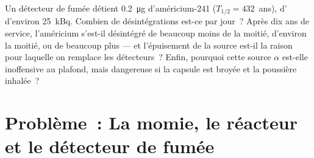 \begin{exercise}[$\star\star\star$]\label{exo:g11:nucleus-radioactivity:15}
Un détecteur de fumée détient \qty{0.2}{\micro\gram} d'américium-241
($T_{1/2} = 432$~ans), d'
 d'environ \qty{25}{kBq}.
Combien de désintégrations est-ce par jour~? Après dix ans de service,
l'américium s'est-il désintégré de beaucoup moins de la moitié,
d'environ la moitié, ou de beaucoup plus --- et l'épuisement de la
source est-il la raison pour laquelle on remplace les détecteurs~?
Enfin, pourquoi cette source $\alpha$ est-elle inoffensive au plafond,
mais dangereuse si la capsule est broyée et la poussière inhalée~?
\end{exercise}

\section{Problème~: La momie, le réacteur et le détecteur de fumée}

